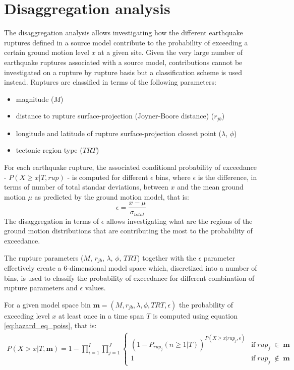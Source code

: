 \section{Disaggregation analysis}
The disaggregation analysis allows investigating how the different earthquake ruptures defined in a source model
contribute to the probability of exceeding a certain ground motion level $x$ at a given site. Given the very
large number of earthquake ruptures associated with a source model, contributions cannot be investigated on a rupture by
rupture basis but a classification scheme is used instead. Ruptures are classified in terms of the following parameters:
\begin{itemize}
	\item magnitude ($M$)
	\item distance to rupture surface-projection (Joyner-Boore distance) ($r_{jb}$)
	\item longitude and latitude of rupture surface-projection closest point ($\lambda$, $\phi$)
	\item tectonic region type ($TRT$)
\end{itemize}
For each earthquake rupture, the associated conditional probability of exceedance - $P(X \ge x | T, rup)$ - is computed
for different $\epsilon$ bins, where $\epsilon$ is the difference, in terms of number of total standar deviations,
between $x$ and the mean ground motion $\mu$ as predicted by the ground motion model, that is:
\begin{equation}
\epsilon = \frac{x - \mu}{\sigma_{total}}
\end{equation}
The disaggregation in terms of $\epsilon$ allows investigating what are the regions of the ground motion distributions
that are contributing the most to the probability of exceedance.

The rupture parameters ($M$, $r_{jb}$, $\lambda$, $\phi$, $TRT$) together with the $\epsilon$ parameter effectively
create a 6-dimensional model space which, discretized into a number of bins, is used to classify the probability
of exceedance for different combination of rupture parameters and $\epsilon$ values.

For a given model space bin $\bm{m} = (M, r_{jb}, \lambda, \phi, TRT, \epsilon)$ the probability of
exceeding level $x$ at least once in a time span $T$ is computed using equation \ref{eq:hazard_eq_poiss}, that is:
\begin{align}
\label{eq:disagg}
P(X > x | T, \bm{m}) =
	1 - \prod_{i=1}^{I}\prod_{j=1}^{J}
	\begin{cases} (1 - P_{rup_{j}}(n \ge 1 | T))^{P(X \ge x | rup_{j}, \epsilon)} & \mbox{if}\;rup_{j}\;\in\;\bm{m}\\
			      1 & \mbox{if}\;rup_{j}\;\notin\;\bm{m}
	\end{cases}
\end{align}


